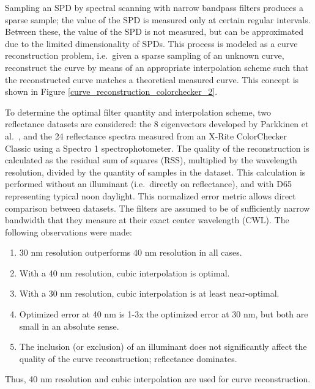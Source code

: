 \documentclass[twocolumn,10pt]{asme2ej}
\newcommand{\id}{\hspace{6 mm}}
\begin{document}
Sampling an SPD by spectral scanning with narrow bandpass filters produces a sparse sample; the value of the SPD is measured only at certain regular intervals. Between these, the value of the SPD is not measured, but can be approximated due to the limited dimensionality of SPDs. This process is modeled as a curve reconstruction problem, i.e.\ given a sparse sampling of an unknown curve, reconstruct the curve by means of an appropriate interpolation scheme such that the reconstructed curve matches a theoretical measured curve. This concept is shown in Figure \ref{curve_reconstruction_colorchecker_2}.

\id To determine the optimal filter quantity and interpolation scheme, two reflectance datasets are considered: the 8 eigenvectors developed by Parkkinen et al.\ \cite{Parkkinen}, and the 24 reflectance spectra measured from an X-Rite ColorChecker Classic \cite{X-Rite} using a Spectro 1 spectrophotometer. The quality of the reconstruction is calculated as the residual sum of squares (RSS), multiplied by the wavelength resolution, divided by the quantity of samples in the dataset. This calculation is performed without an illuminant (i.e.\ directly on reflectance), and with D65 representing typical noon daylight. This normalized error metric allows direct comparison between datasets. The filters are assumed to be of sufficiently narrow bandwidth that they measure at their exact center wavelength (CWL). The following observations were made:

\begin{enumerate}
  \item 30 nm resolution outperforms 40 nm resolution in all cases.
  \item With a 40 nm resolution, cubic interpolation is optimal.
  \item With a 30 nm resolution, cubic interpolation is at least near-optimal.
  \item Optimized error at 40 nm is 1-3x the optimized error at 30 nm, but both are small in an absolute sense.
  \item The inclusion (or exclusion) of an illuminant does not significantly affect the quality of the curve reconstruction; reflectance dominates.
\end{enumerate}

Thus, 40 nm resolution and cubic interpolation are used for curve reconstruction.
\end{document}
